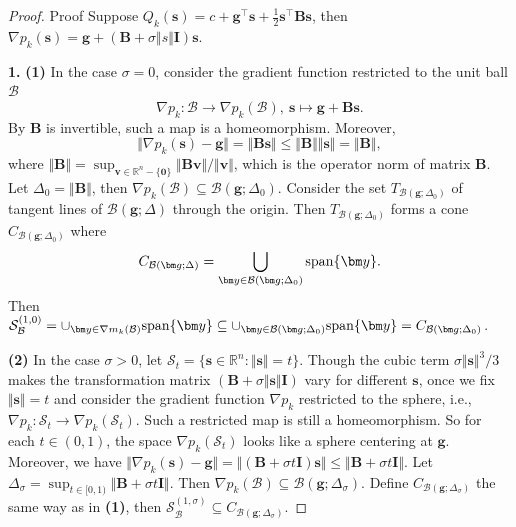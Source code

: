 \documentclass[colorlinks=true, linkcolor=blue, citecolor=blue, urlcolor=blue]{article}
\theoremstyle{plain}
\theoremstyle{definition}
\theoremstyle{remark}
\begin{document}
\begin{proof}{Proof}
Suppose $Q_k(\bm{s})=c+\bm{g}^\top \bm{s}+\frac{1}{2}\bm{s}^\top\bm{B}\bm{s}$, then $\nabla p_k(\bm{s})=\bm{g}+(\bm{B}+\sigma \Vert s\Vert\bm{I})\bm{s}$.

\noindent\textbf{1.}
\textbf{(1)} In the case $\sigma=0$, consider the gradient function
restricted to the unit ball $\mathcal{B}$
\begin{equation*}
    \nabla p_k: \mathcal{B}\to \nabla p_k(\mathcal{B }),\ \bm s\mapsto \bm g+\bm B\bm s.
\end{equation*}
By $\bm B$ is invertible, such a map is a homeomorphism.
Moreover,
\begin{equation*}
    \Vert\nabla p_k(\bm s)-\bm g\Vert=\Vert\bm B\bm s\Vert\leq \Vert\bm B\Vert\Vert\bm s\Vert=\Vert
    \bm B\Vert,
\end{equation*}
where $\Vert \bm B\Vert=\sup_{\bm v\in\mathbb{R}^n-\{\bm 0\}}\Vert\bm B\bm v\Vert/\Vert\bm v\Vert$, which is the operator norm of matrix $\bm B$. Let $\Delta_0=\Vert \bm B\Vert$, then $\nabla p_k(\mathcal{B})\subseteq\mathcal{B}(\bm g;\Delta_0)$. Consider the set $T_{\mathcal{B}(\bm g;\Delta_0)}$ of tangent lines of $\mathcal{B}(\bm g;\Delta)$ through the origin. Then $T_{\mathcal{B}(\bm g;\Delta_0)}$ forms a cone $C_{\mathcal{B}(\bm g;\Delta_0)}$ where 
\begin{equation*}
    C_{\mathcal{B}(\bm g;\Delta)}=\bigcup\limits_{\bm y\in\mathcal{B}(\bm g;\Delta_0)}{\rm span}\{\bm y\}.
\end{equation*}
Then $\mathcal{S}_{\mathcal{B}}^{(1,0)}=\cup_{\bm y\in\nabla m_k(\mathcal{B})}{\rm span}\{\bm y\}
\subseteq\cup_{\bm y\in\mathcal{B}(\bm g;\Delta_0)}{\rm span}\{\bm y\}=C_{\mathcal{B}(\bm g;\Delta_0)}$.

\noindent\textbf{(2)} In the case $\sigma>0$, let $\mathcal{S}_t=\{\bm s\in\mathbb{R}^n:\Vert\bm s\Vert=t\}$. Though the cubic term $\sigma\Vert\bm s\Vert^3/3$ makes the transformation matrix $(\bm B+\sigma\Vert\bm s\Vert\bm I)$ vary for different $\bm s$, once we fix $\Vert \bm s\Vert=t$ and consider the gradient function $\nabla p_k$ restricted to the sphere, i.e., $\nabla p_k:\mathcal{S}_t\to \nabla p_k(\mathcal{S}_t)$.
Such a restricted map is still a homeomorphism. So for each $t\in(0,1)$, the space $\nabla p_k(\mathcal{S}_t)$ looks like a sphere centering at $\bm g$. Moreover, we have $\Vert\nabla p_k(\bm s)-\bm g\Vert=\Vert(\bm B+\sigma t\bm I)\bm s\Vert\leq \Vert \bm B+\sigma t\bm I\Vert$. Let $\Delta_{\sigma}=\sup_{t\in[0,1)}\Vert \bm B+\sigma t\bm I\Vert$. Then $\nabla p_k(\mathcal{B})\subseteq \mathcal{B}(\bm g;\Delta_{\sigma})$. Define $C_{\mathcal{B}(\bm g;\Delta_{\sigma})}$ the same way as in \textbf{(1)}, then $\mathcal{S}_{\mathcal{B}}^{(1,\sigma)}\subseteq C_{\mathcal{B}(\bm g;\Delta_{\sigma})}$.


\end{proof}
\end{document}
